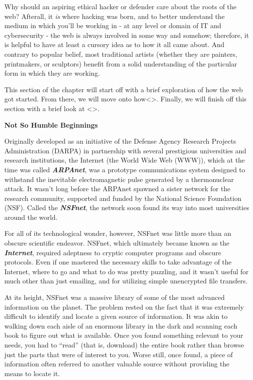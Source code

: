 Why should an aspiring ethical hacker or defender care about the roots of the web? Afterall, it \textit{is }where hacking was born, and to better understand the medium in which you’ll be working in - at any level or domain of IT and cybersecurity - the web is always involved in some way and somehow; therefore, it is helpful to have at least a cursory idea as to how it all came about. And contrary to popular belief, most traditional artists (whether they are painters, printmakers, or sculptors) benefit from a solid understanding of the particular form in which they are working.

This section of the chapter will start off with a brief exploration of how the web got started. From there, we will move onto how<>. Finally, we will finish off this section with a brief look at <>.

\textbf{Not So Humble Beginnings}

Originally developed as an initiative of the Defense Agency Research Projects Administration (DARPA) in partnership with several prestigious universities and research institutions, the Internet (the World Wide Web (WWW)), which at the time was called \textit{\textbf{ARPAnet}}, was a prototype communications system designed to withstand the inevitable electromagnetic pulse generated by a thermonuclear attack. It wasn’t long before the ARPAnet spawned a sister network for the research community, supported and funded by the National Science Foundation (NSF). Called the \textit{\textbf{NSFnet}}, the network soon found its way into most universities around the world.

For all of its technological wonder, however, NSFnet was little more than an obscure scientific endeavor. NSFnet, which ultimately became known as the \textit{\textbf{Internet}}, required adeptness to cryptic computer programs and obscure protocols. Even if one mastered the necessary skills to take advantage of the Internet, where to go and what to do was pretty puzzling, and it wasn’t useful for much other than just emailing, and for utilizing simple unencrypted file transfers.

At its height, NSFnet was a massive library of some of the most advanced information on the planet. The problem rested on the fact that it was extremely difficult to identify and locate a given source of information. It was akin to walking down each aisle of an enormous library in the dark and scanning each book to figure out what is available. Once you found something relevant to your needs, you had to “read” (that is, download) the entire book rather than browse just the parts that were of interest to you. Worse still, once found, a piece of information often referred to another valuable source without providing the means to locate it.

